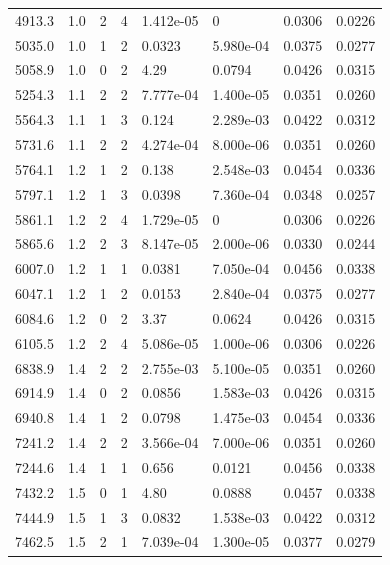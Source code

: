 \documentclass[preview]{standalone}
\begin{document}
{{{\begin{tabular}{L{1.2cm}C{1.2cm} C{0.3cm}C{0.5cm} C{1.4cm}C{1.4cm} C{1.4cm}C{1.4cm}}
  4913.3  &   1.0  & 2     &  4 &  1.412e-05  & 0  & 0.0306 &  0.0226   \\ 
  5035.0  &   1.0  & 1     &  2 &  0.0323  & 5.980e-04  & 0.0375 &  0.0277   \\ 
  5058.9  &   1.0  & 0     &  2 &  4.29  & 0.0794  & 0.0426 &  0.0315   \\ 
  5254.3  &   1.1  & 2     &  2 &  7.777e-04  & 1.400e-05  & 0.0351 &  0.0260   \\ 
  5564.3  &   1.1  & 1     &  3 &  0.124  & 2.289e-03  & 0.0422 &  0.0312   \\ 
  5731.6  &   1.1  & 2     &  2 &  4.274e-04  & 8.000e-06  & 0.0351 &  0.0260   \\ 
  5764.1  &   1.2  & 1     &  2 &  0.138  & 2.548e-03  & 0.0454 &  0.0336   \\ 
  5797.1  &   1.2  & 1     &  3 &  0.0398  & 7.360e-04  & 0.0348 &  0.0257   \\ 
  5861.1  &   1.2  & 2     &  4 &  1.729e-05  & 0  & 0.0306 &  0.0226   \\ 
  5865.6  &   1.2  & 2     &  3 &  8.147e-05  & 2.000e-06  & 0.0330 &  0.0244   \\ 
  6007.0  &   1.2  & 1     &  1 &  0.0381  & 7.050e-04  & 0.0456 &  0.0338   \\ 
  6047.1  &   1.2  & 1     &  2 &  0.0153  & 2.840e-04  & 0.0375 &  0.0277   \\ 
  6084.6  &   1.2  & 0     &  2 &  3.37  & 0.0624  & 0.0426 &  0.0315   \\ 
  6105.5  &   1.2  & 2     &  4 &  5.086e-05  & 1.000e-06  & 0.0306 &  0.0226   \\ 
  6838.9  &   1.4  & 2     &  2 &  2.755e-03  & 5.100e-05  & 0.0351 &  0.0260   \\ 
  6914.9  &   1.4  & 0     &  2 &  0.0856  & 1.583e-03  & 0.0426 &  0.0315   \\ 
  6940.8  &   1.4  & 1     &  2 &  0.0798  & 1.475e-03  & 0.0454 &  0.0336   \\ 
  7241.2  &   1.4  & 2     &  2 &  3.566e-04  & 7.000e-06  & 0.0351 &  0.0260   \\ 
  7244.6  &   1.4  & 1     &  1 &  0.656  & 0.0121  & 0.0456 &  0.0338   \\ 
  7432.2  &   1.5  & 0     &  1 &  4.80  & 0.0888  & 0.0457 &  0.0338   \\ 
  7444.9  &   1.5  & 1     &  3 &  0.0832  & 1.538e-03  & 0.0422 &  0.0312   \\ 
  7462.5  &   1.5  & 2     &  1 &  7.039e-04  & 1.300e-05  & 0.0377 &  0.0279   \\ 

\end{tabular}}}}
\end{document}
